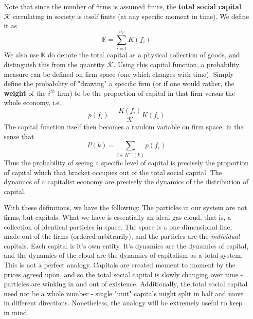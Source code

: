 \documentclass{article}
\theoremstyle{definition}
\theoremstyle{plain}
\theoremstyle{theorem}
\begin{document}
Note that since the number of firms is assumed finite, the \textbf{total social capital} $\mathcal{K}$ circulating in society is itself finite (at any specific moment in time). We define it as
\[ \mathbb{K} = \sum_{i =1}^{n_F}K(f_i) \]
We also use $\mathbb{K}$ do denote the total capital as a physical collection of goods, and distinguish this from the quantity $\mathcal{K}$. Using this capital function, a probability measure can be defined on firm space (one which changes with time). Simply define the probability of "drawing" a specific firm (or if one would rather, the \textbf{weight} of the $i^{th}$ firm) to be the proportion of capital in that firm versus the whole economy, i.e. 
\[ p(f_i) = \frac{K(f_i)}{\mathcal{K}}K(f_i) \]
The capital function itself then becomes a random variable on firm space, in the sense that
\[ P(k) = \sum_{i \in K^{-1}(k)}p(f_i) \]
Thus the probability of seeing a specific level of capital is precisely the proportion of capital which that bracket occupies out of the total social capital. The dynamics of a capitalist economy are precisely the dynamics of the distribution of capital. \par 
With these definitions, we have the following: The particles in our system are not firms, but capitals. What we have is essentially an ideal gas cloud, that is, a collection of identical particles in space. The space is a one dimensional line, made out of the firms (ordered arbitrarily), and the particles are the \textit{individual} capitals. Each capital is it's own entity. It's dynamics are the dynamics of capital, and the dynamics of the cloud are the dynamics of capitalism as a total system. This is not a perfect analogy. Capitals are created moment to moment by the prices agreed upon, and so the total social capital is slowly changing over time - particles are winking in and out of existence. Additionally, the total social capital need not be a whole number - single "unit" capitals might split in half and move in different directions. Nonetheless, the analogy will be extremely useful to keep in mind. \par 
\end{document}
